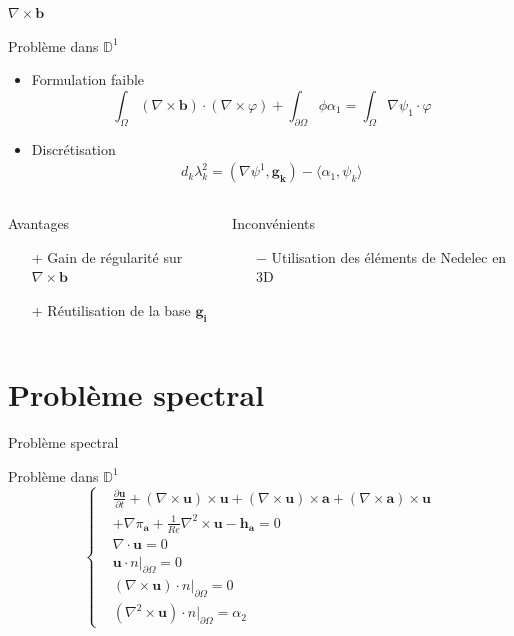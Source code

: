 \documentclass{beamer}
\newcommand{\DD}{{\mathbb{D}}}
\newcommand{\grad}{{\nabla}}
\newcommand{\rot}{{\nabla\times}}
\newcommand{\rott}{{\nabla^2\times}}
\newcommand{\diverg}{{\nabla\cdot}}
\newcommand{\restr}{{\big\rvert_{\partial\Omega}}}
\begin{document}
\begin{frame}{$\rot \mathbf{b}$}
\begin{block}{Problème dans $\DD^1$}
\begin{itemize}
\item Formulation faible
\[
\int_\Omega (\rot\mathbf{b})\cdot(\rot\varphi) + \int_{\partial\Omega} \phi\alpha_1 = \int_\Omega \grad\psi_1\cdot\varphi
\]
\item Discrétisation
\begin{align*}
d_k\lambda_k^2 = (\grad\psi^1,\mathbf{g_k}) - \langle\alpha_1,\psi_k\rangle
\end{align*}
\end{itemize}
\end{block}
\begin{columns}[t]
\begin{column}{5cm}
\begin{exampleblock}{Avantages}
\begin{itemize}
\item[+] Gain de régularité sur $\rot \mathbf{b}$
\item[+] Réutilisation de la base $\mathbf{g_i}$ 
\end{itemize}
\end{exampleblock}
\end{column}
\begin{column}{5cm}
\begin{alertblock}{Inconvénients}
\begin{itemize}
\item[$-$] Utilisation des éléments de Nedelec en 3D
\end{itemize}
\end{alertblock}
\end{column}
\end{columns}
\end{frame}

\section{Problème spectral}
\begin{frame}{Problème spectral}
\begin{block}{Problème dans $\DD^1$}
\[
\left\{
\begin{aligned}
&\frac{\partial \mathbf{u}}{\partial t} + (\rot \mathbf{u})\times \mathbf{u} + (\rot \mathbf{u})\times \mathbf{a} + \left(\rot \mathbf{a}\right)\times \mathbf{u} \\
&+ \grad\pi_\mathbf{a} + \frac{1}{Re}\rott \mathbf{u} - \mathbf{h_a} = 0\\
&\diverg \mathbf{u} = 0\\
&\mathbf{u}\cdot n\restr = 0\\
&(\rot \mathbf{u})\cdot n\restr = 0\\
&(\rott \mathbf{u})\cdot n\restr = \alpha_2
\end{aligned}
\right.
\]
\end{block}
\end{frame}
\end{document}

